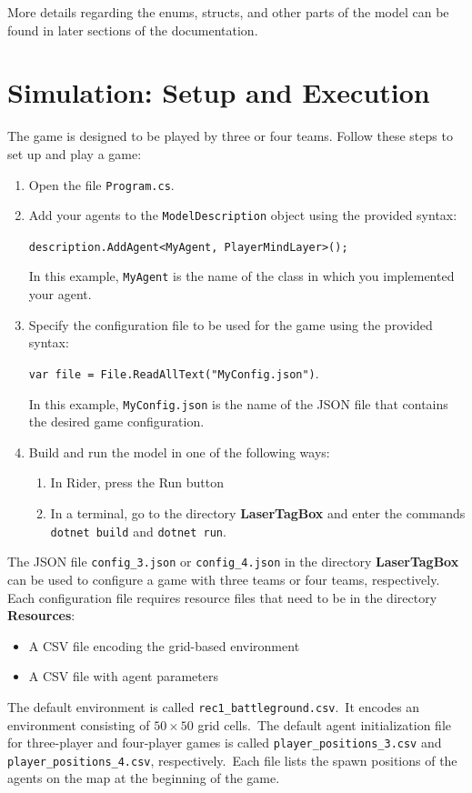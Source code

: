 \documentclass[a4paper,english,DIV=16,11pt,parskip=half,dvipsnames,listof=totoc,index=totoc,bibliography=totoc]{scrartcl}
\begin{document}
More details regarding the enums, structs, and other parts of the model can be found in later sections of the documentation.
%
\section{Simulation: Setup and Execution} \label{sec:simSetup}
%
The game is designed to be played by three or four teams. Follow these steps to set up and play a game:
\begin{enumerate}
  \item Open the file \texttt{Program.cs}.
  \item Add your agents to the \texttt{ModelDescription} object using the provided syntax:%
  \begin{center}
    \texttt{description.AddAgent<MyAgent, PlayerMindLayer>();}
  \end{center}%
  In this example, \texttt{MyAgent} is the name of the class in which you implemented your agent.
  \item Specify the configuration file to be used for the game using the provided syntax:%
  \begin{center}
    \texttt{var file = File.ReadAllText("MyConfig.json")}.
  \end{center}%
  In this example, \texttt{MyConfig.json} is the name of the JSON file that contains the desired game configuration.
  \item Build and run the model in one of the following ways:%
  \begin{enumerate}
    \item In Rider, press the \textcolor{OliveGreen}{\Forward} Run button
    \item In a terminal, go to the directory \textbf{LaserTagBox} and enter the commands \texttt{dotnet build} and \texttt{dotnet run}.
  \end{enumerate}%
\end{enumerate}
%
The JSON file \texttt{config\_3.json} or \texttt{config\_4.json} in the directory \textbf{LaserTagBox} can be used to configure a game with three teams or four teams, respectively. Each configuration file requires resource files that need to be in the directory \textbf{Resources}:%
%
\begin{itemize}
  \item A CSV file encoding the grid-based environment
  \item A CSV file with agent parameters
\end{itemize}
%
The default environment is called \texttt{rec1\_battleground.csv}.~It encodes an environment consisting of $50\times 50$ grid cells.~The default agent initialization file for three-player and four-player games is called \texttt{player\_positions\_3.csv} and \texttt{player\_positions\_4.csv}, respectively.~Each file lists the spawn positions of the agents on the map at the beginning of the game.
%
\end{document}
